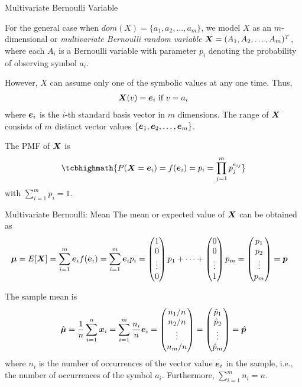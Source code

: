 \begin{frame}{Multivariate Bernoulli Variable}

  For the general case when $dom(X)=\{a_1,a_2,\dots,a_m\}$,
we model $X$ as an
$m$-dimensional or {\em multivariate Bernoulli random variable}
 ${\boldsymbol X} = (A_1, A_2,
\dots, A_m)^T$, where each $A_i$ is a Bernoulli variable with
parameter $p_i$ denoting the probability of observing symbol
$a_i$. 

\medskip
However, $X$ can assume only one of the symbolic
values at any one time. Thus,
\begin{align*}
    {\boldsymbol X}(v) = {\boldsymbol e}_i \text{ if } v = a_i
\end{align*}
where ${\boldsymbol e}_i$ is the $i$-th standard basis vector in $m$ dimensions.
The range of ${\boldsymbol X}$ consists of $m$ distinct vector
values $\{{\boldsymbol e}_1, {\boldsymbol e}_2, \dots, {\boldsymbol e}_m\}$.

\medskip
The PMF of ${\boldsymbol X}$ is
\begin{align*}
\tcbhighmath{
    P(\bX=\be_i) = f(\be_i) = p_i = \prod_{j=1}^m p_{j}^{e_{ij}}
}
\end{align*}
with $\sum_{i=1}^m p_i = 1$.
\end{frame}


\begin{frame}{Multivariate Bernoulli: Mean}
The mean or expected value of ${\boldsymbol X}$ can be obtained as
\begin{align*}
    {\bm \mu} = E[{\boldsymbol X}] & = \sum_{i=1}^m {\boldsymbol e}_i f({\boldsymbol e}_i) =
    \sum_{i=1}^m {\boldsymbol e}_i p_i
     = \begin{pmatrix} 1\\0 \\ \vdots \\ 0 \end{pmatrix}p_1 + \cdots +
        \begin{pmatrix} 0\\0\\\vdots\\1 \end{pmatrix} p_m
    = \begin{pmatrix} p_1\\p_2\\ \vdots\\p_m \end{pmatrix} = {\boldsymbol p}
\end{align*}

\medskip
The sample mean is 
\begin{align*}
    \hat{{\bm \mu}} = {1\over n} \sum_{i=1}^n {\boldsymbol x}_i =
    \sum_{i=1}^m {n_i \over n} {\boldsymbol e}_i =
    \begin{pmatrix} n_1/n\\n_2/n\\ \vdots\\n_m/n \end{pmatrix} =
    \begin{pmatrix} \hat{p}_1\\\hat{p}_2\\\vdots\\\hat{p}_m \end{pmatrix} = \hat{{\boldsymbol p}}
\end{align*}
where $n_i$ is the number of occurrences
of the vector value ${\boldsymbol e}_i$ in the sample,
i.e., the number of occurrences
of the symbol $a_i$. 
Furthermore,
$\sum_{i=1}^m n_i = n$.
\end{frame}



